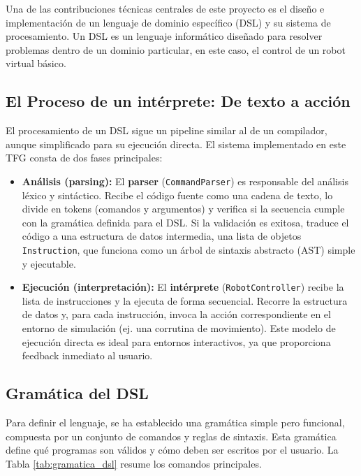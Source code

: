 Una de las contribuciones técnicas centrales de este proyecto es el diseño e implementación de un lenguaje de dominio específico (DSL) \cite{DSL} y su sistema de procesamiento. Un DSL \cite{lenguaje_DSL}es un lenguaje informático diseñado para resolver problemas dentro de un dominio particular, en este caso, el control de un robot virtual básico.

\subsection{El Proceso de un intérprete: De texto a acción}
El procesamiento de un DSL sigue un pipeline similar al de un compilador, aunque simplificado para su ejecución directa. El sistema implementado en este TFG consta de dos fases principales:

\begin{itemize}
	\item \textbf{Análisis (parsing):} El \textbf{parser} (\texttt{CommandParser}) es responsable del análisis léxico y sintáctico. Recibe el código fuente como una cadena de texto, lo divide en tokens (comandos y argumentos) y verifica si la secuencia cumple con la gramática definida para el DSL. Si la validación es exitosa, traduce el código a una estructura de datos intermedia, una lista de objetos \texttt{Instruction}, que funciona como un árbol de sintaxis abstracto (AST) simple y ejecutable.
	
	\item \textbf{Ejecución (interpretación):} El \textbf{intérprete} (\texttt{RobotController}) recibe la lista de instrucciones y la ejecuta de forma secuencial. Recorre la estructura de datos y, para cada instrucción, invoca la acción correspondiente en el entorno de simulación (ej. una corrutina de movimiento). Este modelo de ejecución directa es ideal para entornos interactivos, ya que proporciona feedback inmediato al usuario.
\end{itemize}

\subsection{Gramática del DSL }
Para definir el lenguaje, se ha establecido una gramática simple pero funcional, compuesta por un conjunto de comandos y reglas de sintaxis. Esta gramática define qué programas son válidos y cómo deben ser escritos por el usuario. La Tabla \ref{tab:gramatica_dsl} resume los comandos principales.

